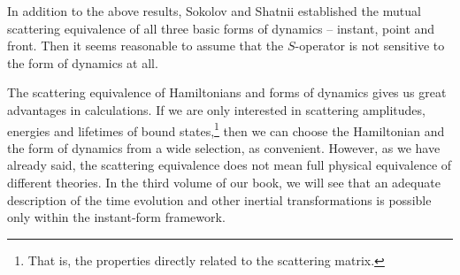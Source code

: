 \documentclass[]{stefan1}
\begin{document}
In addition to the above results, Sokolov and Shatnii \cite{Sokolov_Shatnii,Sokolov_Shatnii2} established the mutual scattering equivalence of all
three basic forms of dynamics -- instant, point and front. Then it seems
reasonable to assume that the $ S $-operator is not sensitive to the
form of dynamics at all.

The scattering equivalence of Hamiltonians and forms of dynamics gives
us great advantages in calculations. If we are only interested in
scattering amplitudes, energies and lifetimes of bound
states,\footnote{That is, the properties directly related to the
scattering matrix.} then we can choose the Hamiltonian and the form of
dynamics from a wide selection, as convenient. However, as we have
already said, the scattering equivalence does not mean full physical
equivalence of different theories. In the third volume of our book, we
will see that an adequate description of the time evolution and other
inertial transformations is possible only within the instant-form
framework.
\end{document}
